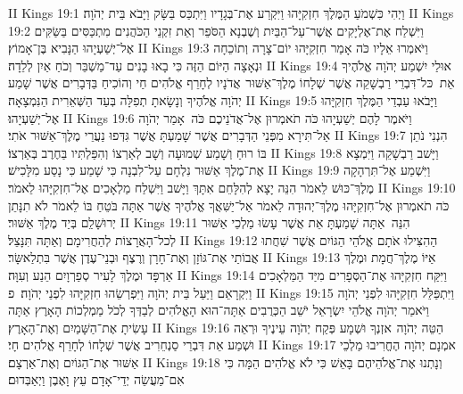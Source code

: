 II Kings 19:1	וַיְהִי כִּשְׁמֹעַ הַמֶּלֶךְ חִזְקִיָּהוּ וַיִּקְרַע אֶת־בְּגָדָיו וַיִּתְכַּס בַּשָּׂק וַיָּבֹא בֵּית יְהֹוָה׃
II Kings 19:2	וַיִּשְׁלַח אֶת־אֶלְיָקִים אֲשֶׁר־עַל־הַבַּיִת וְשֶׁבְנָא הַסֹּפֵר וְאֵת זִקְנֵי הַכֹּהֲנִים מִתְכַּסִּים בַּשַּׂקִּים אֶל־יְשַׁעְיָהוּ הַנָּבִיא בֶּן־אָמוֹץ׃
II Kings 19:3	וַיֹּאמְרוּ אֵלָיו כֹּה אָמַר חִזְקִיָּהוּ יוֹם־צָרָה וְתוֹכֵחָה וּנְאָצָה הַיּוֹם הַזֶּה כִּי בָאוּ בָנִים עַד־מַשְׁבֵּר וְכֹחַ אַיִן לְלֵדָה׃
II Kings 19:4	אוּלַי יִשְׁמַע יְהֹוָה אֱלֹהֶיךָ אֵת  כּל־דִּבְרֵי רַבְשָׁקֵה אֲשֶׁר שְׁלָחוֹ מֶלֶךְ־אַשּׁוּר  אֲדֹנָיו לְחָרֵף אֱלֹהִים חַי וְהוֹכִיחַ בַּדְּבָרִים אֲשֶׁר שָׁמַע יְהֹוָה אֱלֹהֶיךָ וְנָשָׂאתָ תְפִלָּה בְּעַד הַשְּׁאֵרִית הַנִּמְצָאָה׃
II Kings 19:5	וַיָּבֹאוּ עַבְדֵי הַמֶּלֶךְ חִזְקִיָּהוּ אֶל־יְשַׁעְיָהוּ׃
II Kings 19:6	וַיֹּאמֶר לָהֶם יְשַׁעְיָהוּ כֹּה תֹאמְרוּן אֶל־אֲדֹנֵיכֶם כֹּה  אָמַר יְהֹוָה אַל־תִּירָא מִפְּנֵי הַדְּבָרִים אֲשֶׁר שָׁמַעְתָּ אֲשֶׁר גִּדְּפוּ נַעֲרֵי מֶלֶךְ־אַשּׁוּר אֹתִי׃
II Kings 19:7	הִנְנִי נֹתֵן בּוֹ רוּחַ וְשָׁמַע שְׁמוּעָה וְשָׁב לְאַרְצוֹ וְהִפַּלְתִּיו בַּחֶרֶב בְּאַרְצוֹ׃
II Kings 19:8	וַיָּשׁב רַבְשָׁקֵה וַיִּמְצָא אֶת־מֶלֶךְ אַשּׁוּר נִלְחָם עַל־לִבְנָה כִּי שָׁמַע כִּי נָסַע מִלָּכִישׁ׃
II Kings 19:9	וַיִּשְׁמַע אֶל־תִּרְהָקָה מֶלֶךְ־כּוּשׁ לֵאמֹר הִנֵּה יָצָא לְהִלָּחֵם אִתָּךְ וַיָּשׁב וַיִּשְׁלַח מַלְאָכִים אֶל־חִזְקִיָּהוּ לֵאמֹר׃
II Kings 19:10	כֹּה תֹאמְרוּן אֶל־חִזְקִיָּהוּ מֶלֶךְ־יְהוּדָה לֵאמֹר אַל־יַשִּׁאֲךָ אֱלֹהֶיךָ אֲשֶׁר אַתָּה בֹּטֵחַ בּוֹ לֵאמֹר לֹא תִנָּתֵן יְרוּשָׁלַ͏ִם בְּיַד מֶלֶךְ אַשּׁוּר׃
II Kings 19:11	הִנֵּה  אַתָּה שָׁמַעְתָּ אֵת אֲשֶׁר עָשׂוּ מַלְכֵי אַשּׁוּר לְכל־הָאֲרָצוֹת לְהַחֲרִימָם וְאַתָּה תִּנָּצֵל׃
II Kings 19:12	הַהִצִּילוּ אֹתָם אֱלֹהֵי הַגּוֹיִם אֲשֶׁר שִׁחֲתוּ אֲבוֹתַי אֶת־גּוֹזָן וְאֶת־חָרָן וְרֶצֶף וּבְנֵי־עֶדֶן אֲשֶׁר בִּתְלַאשָּׂר׃
II Kings 19:13	אַיּוֹ מֶלֶךְ־חֲמָת וּמֶלֶךְ אַרְפָּד וּמֶלֶךְ לָעִיר סְפַרְוָיִם הֵנַע וְעִוָּה׃
II Kings 19:14	וַיִּקַּח חִזְקִיָּהוּ אֶת־הַסְּפָרִים מִיַּד הַמַּלְאָכִים וַיִּקְרָאֵם וַיַּעַל בֵּית יְהֹוָה וַיִּפְרְשֵׂהוּ חִזְקִיָּהוּ לִפְנֵי יְהֹוָה׃ {פ}
II Kings 19:15	וַיִּתְפַּלֵּל חִזְקִיָּהוּ לִפְנֵי יְהֹוָה וַיֹּאמַר יְהֹוָה אֱלֹהֵי יִשְׂרָאֵל יֹשֵׁב הַכְּרֻבִים אַתָּה־הוּא הָאֱלֹהִים לְבַדְּךָ לְכֹל מַמְלְכוֹת הָאָרֶץ אַתָּה עָשִׂיתָ אֶת־הַשָּׁמַיִם וְאֶת־הָאָרֶץ׃
II Kings 19:16	הַטֵּה יְהֹוָה  אזְנְךָ וּשְׁמָע פְּקַח יְהֹוָה עֵינֶיךָ וּרְאֵה וּשְׁמַע אֵת דִּבְרֵי סַנְחֵרִיב אֲשֶׁר שְׁלָחוֹ לְחָרֵף אֱלֹהִים חָי׃
II Kings 19:17	אמְנָם יְהֹוָה הֶחֱרִיבוּ מַלְכֵי אַשּׁוּר אֶת־הַגּוֹיִם וְאֶת־אַרְצָם׃
II Kings 19:18	וְנָתְנוּ אֶת־אֱלֹהֵיהֶם בָּאֵשׁ כִּי לֹא אֱלֹהִים הֵמָּה כִּי אִם־מַעֲשֵׂה יְדֵי־אָדָם עֵץ וָאֶבֶן וַיְאַבְּדוּם׃
